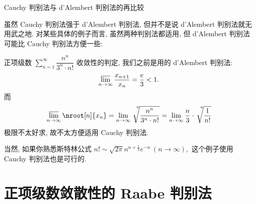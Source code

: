 
\begin{frame}{Cauchy 判别法与 d'Alembert 判别法的再比较}

虽然 Cauchy 判别法强于 d'Alembert 判别法, 但并不是说 d'Alembert 判别法就无用武之地. 对某些具体的例子而言, 虽然两种判别法都适用, 但 d'Alembert 判别法可能比 Cauchy 判别法方便一些:

\pause
\vspace{0.5em}

\begin{eg}
正项级数 $\sum\limits_{n=1}^\infty \dfrac{n^n}{3^n\cdot n!}$ 收敛性的判定, 我们之前是用的 d'Alembert 判别法:
\[
\varlimsup\limits_{n\to\infty} \dfrac{x_{n+1}}{x_n} = \dfrac{e}{3} < 1.
\]
\pause
而
\[
\varlimsup\limits_{n\to\infty} \nroot[n]{x_n} = \lim\limits_{n\to\infty} \sqrt[\leftroot{-7}\uproot{15}n]{\dfrac{n^n}{3^n\cdot n!}} = \lim\limits_{n\to\infty} \dfrac{n}{3} \cdot \sqrt[\leftroot{-7}\uproot{15}n]{\dfrac{1}{n!}}
\]
极限不太好求, 故不太方便适用 Cauchy 判别法.

\pause
\vspace{0.5em}

当然, 如果你熟悉斯特林公式 $n! \sim \sqrt{2\pi} n^{n+\frac{1}{2}} e^{-n} ~ (n\to\infty),$ 这个例子使用 Cauchy 判别法也是可行的.
\end{eg}

\end{frame}


\section[Raabe\\判别法]{正项级数敛散性的 Raabe 判别法}


